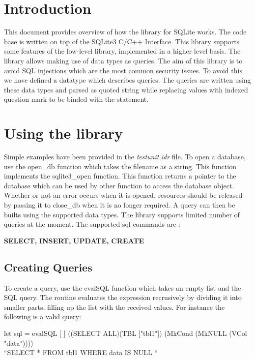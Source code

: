 \documentclass[11pt]{article}
\begin{document}
         
 \section{Introduction}
\label{Introduction} 
This document provides overview of how the library for SQLite works. The code base is written on top of the
SQLite3 C/C++ Interface.
This library supports some features of the low-level library, implemented in a higher level basis.
The library allows making use of data types as queries. The aim of this library is to avoid
SQL injections which are the most common security issues.
To avoid this we have defined a datatype which describes queries.
The queries are written using these data types and parsed as quoted string
while replacing values with indexed question mark to be binded with the statement.
\section{Using the library}
\label{Using the library}
Simple examples have been provided in the \emph{testunit.idr} file.
To open a database, use the open\_db function which takes the filename as a string. 
This function implements the sqlite3\_open function.
This function returns a pointer to the database which can be used by other function
to access the database object.
Whether or not an error occurs when it is opened,
resources should be released by passing it to close\_db when it is no longer required.
A query can then be builts using the supported data types.
The library supports limited number of queries at the moment. The supported sql commands are :
\newline

\textbf{SELECT,}
\textbf{INSERT,}
\textbf{UPDATE,}
\textbf{CREATE}

\subsection{Creating Queries}
\label{Creating Queries}

To create a query, use the evalSQL function which takes an empty list and the SQL query.
The routine evaluates the expression recrusively by dividing it into smaller parts,
filling up the list with the received values. For instance the following is a valid query:

let sql = evalSQL [ ] ((SELECT ALL)(TBL ["tbl1"]) (MkCond (MkNULL (VCol "data"))))
\newline
{}
\\“SELECT * FROM tbl1 WHERE data IS NULL “
\end{document}
